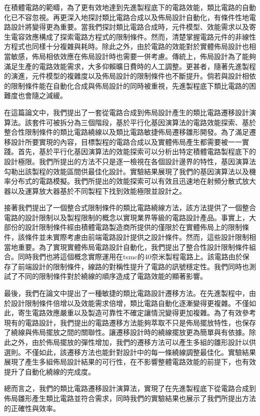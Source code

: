 
在積體電路的範疇，為了更有效地達到先進製程底下的電路效能，類比電路的自動化已不容忽視。再更深入地探討類比電路合成以及佈局設計自動化，有條件性地電路設計將變得更為重要。當我們探討類比電路合成時，元件模型、效能需求以及寄生電容效應構成了探索電路方程式的限制條件。然而，清楚掌握電路元件的非線性方程式也同樣十分複雜與耗時。除此之外，由於電路的效能對於實體佈局設計也相當敏感，佈局相依效應在佈局設計時也需要一併考慮。傳統上，佈局設計為了能夠滿足生產的電路效能需求，大多仰賴曠日費時的人工調整。更甚者，隨著先進製程的演進，元件模型的複雜度以及佈局設計的限制條件也不斷提升。倘若與設計相依的限制條件能在自動化合成與佈局設計的同時被重視，先進製程底下類比電路的困難度也會隨之減緩。

在這篇論文中，我們提出了一套從電路合成到佈局設計產生的類比電路遷移設計演算法。該套件可被拆分為三個階段，基於平行化基因演算法的電路效能探索、基於整合性限制條件的類比電路繞線以及類比電路敏捷佈局遷移雛形開發。為了滿足遷移設計所要實現的內容，目標製程的電路合成以及實體佈局產生都需要被一一實踐。首先，基於平行化基因演算法的效能探索可以分析出特定積體電路製程底下的設計極限。我們所提出的方法不只是逐一檢視在各個設計邊界的特性，基因演算法勾勒出該製程的效能區間供最佳化設計。實驗結果展現了我們的基因演算法以及機率分布式的電路模擬。我們所提出的效能探索可以有效且迅速地在射頻分散式放大器以及運算放大器基於不同製程下找到效能極限並設計之。

接著我們提出了一個整合式限制條件的類比電路繞線方法，該方法提供了一個整合電路的設計限制以及製程限制的概念以實現業界等級的電路設計產品。事實上，大部份的設計限制條件經由積體電路製造商所提供的僅限於在實體佈局上的限制條件，該條件並未實際考慮由前端電路設計提供之設計條件。然而，這些設計限制相當地重要。為了實現實體佈局電路設計自動化，我們提出了整合性設計限制條件組合。同時我們也將這個概念實際運用在tsmc的40奈米製程電路上。該電路由於保存了前端設計的限制條件，線路的對稱性提升了電路的訊號穩定性。我們同時也測試了不同的限制條件對於繞線的順序造成了電路效能的顯著影響。

最後，我們在論文中提出了一種敏捷的類比電路設計遷移方法。在先進製程中，由於設計限制條件倍增以及效能需求倍增，類比電路自動化逐漸變得更複雜。不僅如此，寄生電路效應嚴重以及製造可靠性不確定讓情況變得更加複雜。為了有效參考現有的電路設計，我們提出的電路遷移方法能夠萃取不只是佈局擺放特性，也保存了繞線與佈局擺放之間的關聯性。讓遷移設計時的繞線擺放更為簡單與有依據。除此之外，由於佈局擺放的彈性增加，我們的遷移方法可以產生多組的雛形設計以供選則。不僅如此，該遷移方法也能針對設計中的每一條繞線調整最佳化。實驗結果展現了產生多組佈局設計結果的可行性，在不影響整體電路效能的前提下，也有效提升了自動化繞線的完成度。

總而言之，我們的類比電路遷移設計演算法，實現了在先進製程底下從電路合成到佈局雛形產生類比電路並符合需求，同時我們的實驗結果也展示了我們所提出方法的正確性與效率。